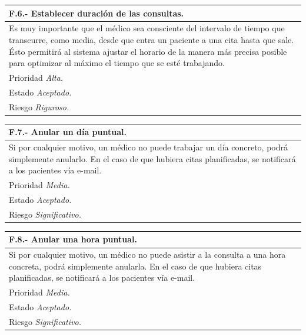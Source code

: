 \documentclass[a4paper,oneside,11pt]{book}
\begin{document}
\begin{center}
\begin{tabulary}{15cm}{|L|}
	\hline
		\bf{F.6.- Establecer duración de las consultas.} \\
	\hline
		Es muy importante que el médico sea consciente del intervalo de tiempo que transcurre, como media, desde que entra un paciente a una cita hasta que sale. Ésto permitirá al sistema ajustar el horario de la manera más precisa posible para optimizar al máximo el tiempo que se esté trabajando. \\
	\hline
		Prioridad \textit{Alta.} \\
	\hline
		Estado \textit{Aceptado.} \\
	\hline
		Riesgo \textit{Riguroso.} \\
	\hline
\end{tabulary}
\end{center}

\begin{center}
\begin{tabulary}{15cm}{|L|}
	\hline
		\bf{F.7.- Anular un día puntual.} \\
	\hline
		Si por cualquier motivo, un médico no puede trabajar un día concreto, podrá simplemente anularlo. En el caso de que hubiera citas planificadas, se notificará a los pacientes vía e-mail. \\
	\hline
		Prioridad \textit{Media.} \\
	\hline
		Estado \textit{Aceptado.} \\
	\hline
		Riesgo \textit{Significativo.} \\
	\hline
\end{tabulary}
\end{center}

\begin{center}
\begin{tabulary}{15cm}{|L|}
	\hline
		\bf{F.8.- Anular una hora puntual.} \\
	\hline
		Si por cualquier motivo, un médico no puede asistir a la consulta a una hora concreta, podrá simplemente anularla. En el caso de que hubiera citas planificadas, se notificará a los pacientes vía e-mail. \\
	\hline
		Prioridad \textit{Media.} \\
	\hline
		Estado \textit{Aceptado.} \\
	\hline
		Riesgo \textit{Significativo.} \\
	\hline
\end{tabulary}
\end{center}
\end{document}
